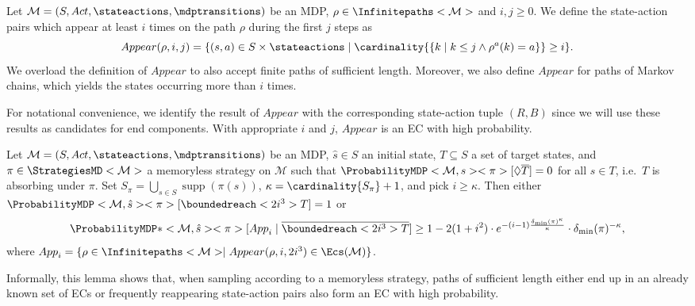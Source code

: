 \documentclass{article}
\newcommand{\UnionSym}{\bigcup}
\newcommand{\Union}{\UnionSym}
\newcommand{\MDP}{\mathcal{M}}
\newcommand{\States}{S}
\newcommand{\initialstate}{\hat{s}}
\newcommand{\Actions}{Act}
\newcommand{\infinitepath}{\rho}
\newcommand{\strategy}{\pi}
\DeclareMathOperator{\support}{supp}
\newcommand{\reach}{\Diamond}
\newcommand{\targetset}{T}
\begin{document}
\newcommand{\appear}{Appear}

\begin{definition}
	Let $\MDP = (\States, \Actions, \stateactions, \mdptransitions)$ be an MDP, $\infinitepath \in \Infinitepaths<\MDP>$ and $i, j \geq 0$.
	We define the state-action pairs which appear at least $i$ times on the path $\infinitepath$ during the first $j$ steps as
	\begin{equation*}
		\appear(\infinitepath, i, j) = \{(s, a) \in \States \times \stateactions \mid \cardinality{\{k \mid k \leq j \land \infinitepath^a(k) = a\}} \geq i\}.
	\end{equation*}
	We overload the definition of $\appear$ to also accept finite paths of sufficient length.
	Moreover, we also define $\appear$ for paths of Markov chains, which yields the states occurring more than $i$ times.
\end{definition}
For notational convenience, we identify the result of $\appear$ with the corresponding state-action tuple $(R, B)$ since we will use these results as candidates for end components.
With appropriate $i$ and $j$, $\appear$ is an EC with high probability.
\begin{lemma} \label{stm:dql:appear_is_ec_probability}
	Let $\MDP = (\States, \Actions, \stateactions, \mdptransitions)$ be an MDP, $\initialstate \in \States$ an initial state, $\targetset \subseteq \States$ a set of target states, and $\strategy \in \StrategiesMD<\MDP>$ a memoryless strategy on $\MDP$ such that $\ProbabilityMDP<\MDP, s><\strategy>[\reach \overline{\targetset}] = 0$ for all $s \in \targetset$, i.e.\ $\targetset$ is absorbing under $\strategy$.
	Set $\States_\strategy = \Union_{s \in \States} \support(\strategy(s))$, $\kappa = \cardinality{\States_\strategy} + 1$, and pick $i \geq \kappa$.
	Then either $\ProbabilityMDP<\MDP, \initialstate><\strategy>[\boundedreach<2i^3> T] = 1$ or
	\begin{equation*}
		\ProbabilityMDP*<\MDP, \initialstate><\strategy>[{App}_i \mid \overline{\boundedreach<2i^3> T}] \geq 1 - 2 (1 + i^2) \cdot e^{- (i - 1) \frac{\delta_{\min}(\strategy)^\kappa}{\kappa}} \cdot \delta_{\min}(\strategy)^{-\kappa},
	\end{equation*}
	where ${App}_i = \{\infinitepath \in \Infinitepaths<\MDP> \mid \appear(\infinitepath, i, 2i^3) \in \Ecs(\MDP)\}$.
\end{lemma}
Informally, this lemma shows that, when sampling according to a memoryless strategy, paths of sufficient length either end up in an already known set of ECs or frequently reappearing state-action pairs also form an EC with high probability.
\end{document}
